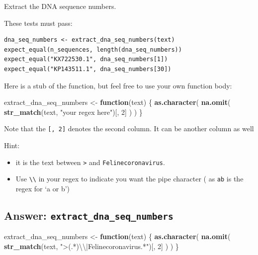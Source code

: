 \documentclass[]{book}
\newenvironment{Shaded}{}{}
\newcommand{\CharTok}[1]{\textcolor[rgb]{0.25,0.44,0.63}{#1}}
\newcommand{\ControlFlowTok}[1]{\textcolor[rgb]{0.00,0.44,0.13}{\textbf{#1}}}
\newcommand{\DecValTok}[1]{\textcolor[rgb]{0.25,0.63,0.44}{#1}}
\newcommand{\KeywordTok}[1]{\textcolor[rgb]{0.00,0.44,0.13}{\textbf{#1}}}
\newcommand{\NormalTok}[1]{#1}
\newcommand{\StringTok}[1]{\textcolor[rgb]{0.25,0.44,0.63}{#1}}
\providecommand{\tightlist}{%
  \setlength{\itemsep}{0pt}\setlength{\parskip}{0pt}}
\begin{document}
Extract the DNA sequence numbers.

These tests must pass:

\begin{verbatim}
dna_seq_numbers <- extract_dna_seq_numbers(text)
expect_equal(n_sequences, length(dna_seq_numbers))
expect_equal("KX722530.1", dna_seq_numbers[1])
expect_equal("KP143511.1", dna_seq_numbers[30])
\end{verbatim}

Here is a stub of the function, but feel free to use your own function body:

\begin{Shaded}
\begin{Highlighting}[]
\NormalTok{extract_dna_seq_numbers <-}\StringTok{ }\ControlFlowTok{function}\NormalTok{(text) \{}
  \KeywordTok{as.character}\NormalTok{(}
    \KeywordTok{na.omit}\NormalTok{(}
      \KeywordTok{str_match}\NormalTok{(text, }\StringTok{"your regex here"}\NormalTok{)[, }\DecValTok{2}\NormalTok{]}
\NormalTok{    )}
\NormalTok{  )}
\NormalTok{\}}
\end{Highlighting}
\end{Shaded}

Note that the \texttt{{[},\ 2{]}} denotes the second column. It can be another column as well

Hint:

\begin{itemize}
\tightlist
\item
  it is the text between \texttt{\textgreater{}} and \texttt{\textbar{}Felinecoronavirus}.
\item
  Use \texttt{\textbackslash{}\textbackslash{}\textbar{}} in your regex to indicate you want the pipe character (
  as \texttt{a\textbar{}b} is the regex for `a or b')
\end{itemize}

\hypertarget{answer-extract_dna_seq_numbers}{%
\subsection{\texorpdfstring{Answer: \texttt{extract\_dna\_seq\_numbers}}{Answer: extract\_dna\_seq\_numbers}}\label{answer-extract_dna_seq_numbers}}

\begin{Shaded}
\begin{Highlighting}[]
\NormalTok{extract_dna_seq_numbers <-}\StringTok{ }\ControlFlowTok{function}\NormalTok{(text) \{}
  \KeywordTok{as.character}\NormalTok{(}
    \KeywordTok{na.omit}\NormalTok{(}
      \KeywordTok{str_match}\NormalTok{(text, }\StringTok{">(.*)}\CharTok{\textbackslash{}\textbackslash{}}\StringTok{|Felinecoronavirus.*"}\NormalTok{)[, }\DecValTok{2}\NormalTok{]}
\NormalTok{    )}
\NormalTok{  )}
\NormalTok{\}}
\end{Highlighting}
\end{Shaded}
\end{document}

